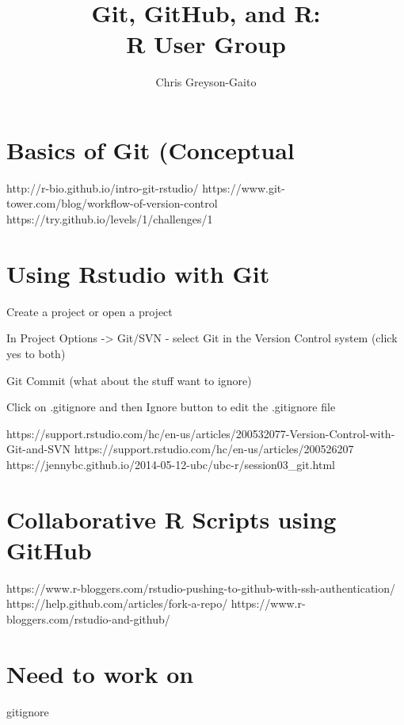 \documentclass[12pt,letterpaper]{article} %
\begin{document}
\title{Git, GitHub, and R:\\ R User Group}
\author{Chris Greyson-Gaito}
\date{}
\maketitle
\section*{Basics of Git (Conceptual}
http://r-bio.github.io/intro-git-rstudio/
https://www.git-tower.com/blog/workflow-of-version-control
https://try.github.io/levels/1/challenges/1

\section*{Using Rstudio with Git}
\begin{tabular}
\item Create a project or open a project
\item In Project Options -> Git/SVN - select Git in the Version Control system (click yes to both)
\item Git Commit (what about the stuff want to ignore)
\item Click on .gitignore and then Ignore button to edit the .gitignore file

\end{tabular}
https://support.rstudio.com/hc/en-us/articles/200532077-Version-Control-with-Git-and-SVN
https://support.rstudio.com/hc/en-us/articles/200526207
https://jennybc.github.io/2014-05-12-ubc/ubc-r/session03_git.html


\section*{Collaborative R Scripts using GitHub}
https://www.r-bloggers.com/rstudio-pushing-to-github-with-ssh-authentication/
https://help.github.com/articles/fork-a-repo/
https://www.r-bloggers.com/rstudio-and-github/
\section*{Need to work on}
gitignore
\end{document}

